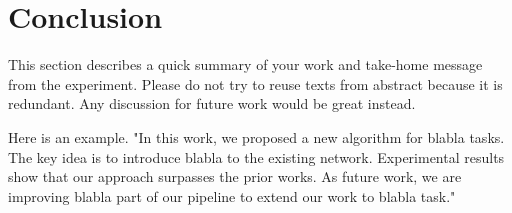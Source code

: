 \section{Conclusion}

This section describes a quick summary of your work and take-home message from the experiment. Please do not try to reuse texts from abstract because it is redundant. Any discussion for future work would be great instead.

Here is an example. "In this work, we proposed a new algorithm for blabla tasks. The key idea is to introduce blabla to the existing network. Experimental results show that our approach surpasses the prior works. As future work, we are improving blabla part of our pipeline to extend our work to blabla task."